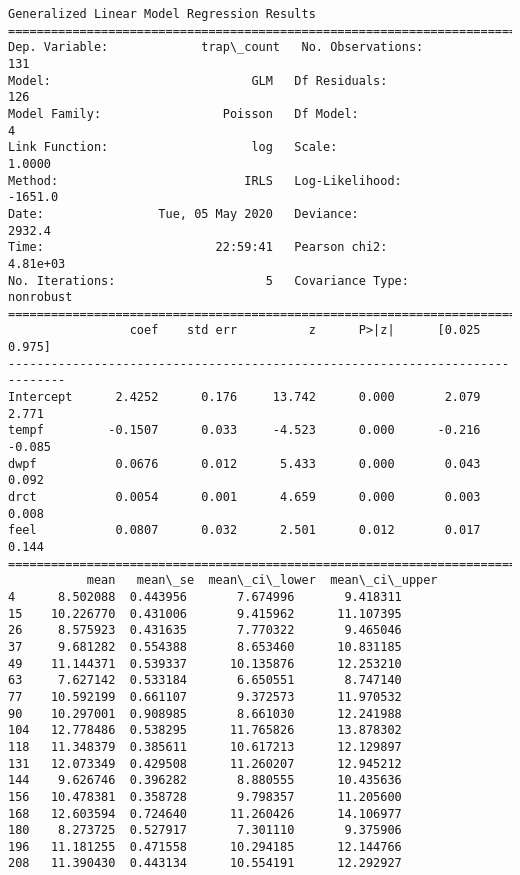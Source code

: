 \documentclass[11pt]{article}
\begin{document}
    \begin{Verbatim}[commandchars=\\\{\}]
                 Generalized Linear Model Regression Results                  
==============================================================================
Dep. Variable:             trap\_count   No. Observations:                  131
Model:                            GLM   Df Residuals:                      126
Model Family:                 Poisson   Df Model:                            4
Link Function:                    log   Scale:                          1.0000
Method:                          IRLS   Log-Likelihood:                -1651.0
Date:                Tue, 05 May 2020   Deviance:                       2932.4
Time:                        22:59:41   Pearson chi2:                 4.81e+03
No. Iterations:                     5   Covariance Type:             nonrobust
==============================================================================
                 coef    std err          z      P>|z|      [0.025      0.975]
------------------------------------------------------------------------------
Intercept      2.4252      0.176     13.742      0.000       2.079       2.771
tempf         -0.1507      0.033     -4.523      0.000      -0.216      -0.085
dwpf           0.0676      0.012      5.433      0.000       0.043       0.092
drct           0.0054      0.001      4.659      0.000       0.003       0.008
feel           0.0807      0.032      2.501      0.012       0.017       0.144
==============================================================================
           mean   mean\_se  mean\_ci\_lower  mean\_ci\_upper
4      8.502088  0.443956       7.674996       9.418311
15    10.226770  0.431006       9.415962      11.107395
26     8.575923  0.431635       7.770322       9.465046
37     9.681282  0.554388       8.653460      10.831185
49    11.144371  0.539337      10.135876      12.253210
63     7.627142  0.533184       6.650551       8.747140
77    10.592199  0.661107       9.372573      11.970532
90    10.297001  0.908985       8.661030      12.241988
104   12.778486  0.538295      11.765826      13.878302
118   11.348379  0.385611      10.617213      12.129897
131   12.073349  0.429508      11.260207      12.945212
144    9.626746  0.396282       8.880555      10.435636
156   10.478381  0.358728       9.798357      11.205600
168   12.603594  0.724640      11.260426      14.106977
180    8.273725  0.527917       7.301110       9.375906
196   11.181255  0.471558      10.294185      12.144766
208   11.390430  0.443134      10.554191      12.292927

\end{Verbatim}
\end{document}
